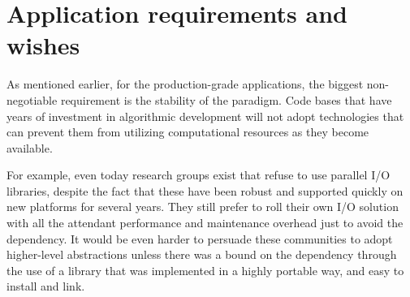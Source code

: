 

\section{Application requirements and wishes}
As mentioned earlier, for the production-grade applications, the
biggest non-negotiable requirement is the stability of the paradigm.
Code bases that have years of investment in algorithmic development will not
adopt technologies that can prevent them from utilizing computational
resources as they become available. 

For example, even today research groups exist that refuse to use
parallel I/O libraries, despite the fact that these have been robust
and supported quickly on new platforms for several years. They still
prefer to roll their own I/O solution with all the attendant
performance and maintenance overhead just to avoid the dependency. It
would be even harder to persuade these communities to adopt higher-level
abstractions unless there was a bound on the dependency through
the use of a library that was implemented in a highly portable way,
and easy to install and link.

